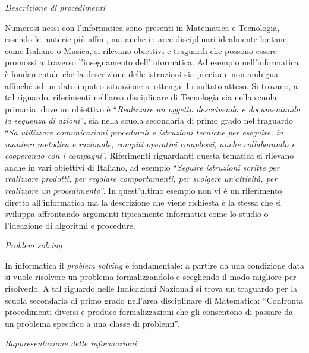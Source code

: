 \documentclass[12pt]{report}
\begin{document}
\bigskip
\textit{Descrizione di procedimenti}

\noindent Numerosi nessi con l'informatica sono presenti in Matematica e Tecnologia, essendo le materie più affini, ma anche in aree disciplinari idealmente lontane, come Italiano o Musica, si rilevano obiettivi e traguardi che possono essere promossi attraverso l'insegnamento dell'informatica. Ad esempio nell'informatica è fondamentale che la descrizione delle istruzioni sia precisa e non ambigua affinché ad un dato input o situazione si ottenga il risultato atteso.
Si trovano, a tal riguardo, riferimenti nell'area disciplinare di Tecnologia sia nella scuola primaria, dove un obiettivo è ``\textit{Realizzare un oggetto descrivendo e documentando la sequenza di azioni}'', sia nella scuola secondaria di primo grado nel traguardo ``\textit{Sa utilizzare comunicazioni procedurali e istruzioni tecniche per eseguire, in maniera metodica e razionale, compiti operativi complessi, anche collaborando e cooperando con i compagni}''.
Riferimenti riguardanti questa tematica si rilevano anche in vari obiettivi di Italiano, ad esempio ``\textit{Seguire istruzioni scritte per realizzare prodotti, per regolare comportamenti, per svolgere un'attività, per realizzare un procedimento}''. In quest'ultimo esempio non vi è un riferimento diretto all'informatica ma la descrizione che viene richiesta è la stessa che si sviluppa affrontando argomenti tipicamente informatici come lo studio o l'ideazione di algoritmi e procedure.


\bigskip
\textit{Problem solving}

\noindent In informatica il \textit{problem solving} è fondamentale: a partire da una condizione data si vuole risolvere un problema formalizzandolo e scegliendo il modo migliore per risolverlo. A tal riguardo nelle Indicazioni Nazionali si trova un traguardo per la scuola secondaria di primo grado nell'area disciplinare di Matematica: ``Confronta procedimenti diversi e produce formalizzazioni che gli consentono di passare da un problema specifico a una classe di problemi''.

\bigskip
\textit{Rappresentazione delle informazioni}
\end{document}
